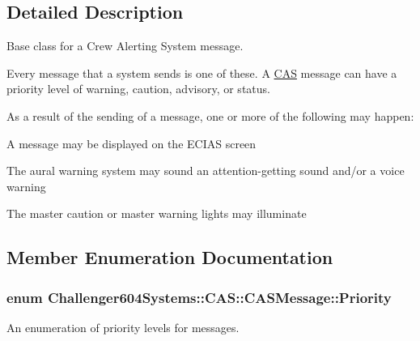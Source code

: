 \subsection{Detailed Description}
Base class for a Crew Alerting System message. 

Every message that a system sends is one of these. A \hyperlink{namespace_challenger604_systems_1_1_c_a_s}{C\-A\-S} message can have a priority level of warning, caution, advisory, or status. \par
\par
 As a result of the sending of a message, one or more of the following may happen\-: 
\begin{DoxyItemize}
\item A message may be displayed on the E\-C\-I\-A\-S screen 
\item The aural warning system may sound an attention-\/getting sound and/or a voice warning 
\item The master caution or master warning lights may illuminate 
\end{DoxyItemize}

\subsection{Member Enumeration Documentation}
\hypertarget{class_challenger604_systems_1_1_c_a_s_1_1_c_a_s_message_a5a503c8cb9618403fcd342dca9ba1ca9}{
\subsubsection[{Priority}]{\setlength{\rightskip}{0pt plus 5cm}enum {\bf Challenger604\-Systems\-::\-C\-A\-S\-::\-C\-A\-S\-Message\-::\-Priority}}}\label{class_challenger604_systems_1_1_c_a_s_1_1_c_a_s_message_a5a503c8cb9618403fcd342dca9ba1ca9}


An enumeration of priority levels for messages. 

